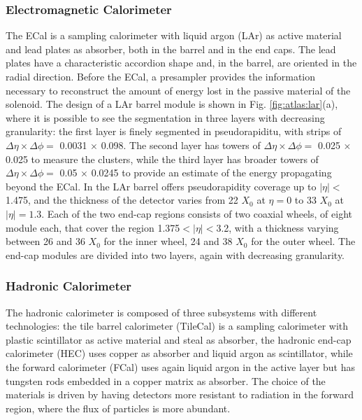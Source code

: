 \subsubsection*{Electromagnetic Calorimeter}

The ECal is a sampling calorimeter with liquid argon (LAr) as active material and lead plates as absorber, both in the barrel and in the end caps. The lead plates have a characteristic accordion shape and, in the barrel, are oriented in the radial direction. Before the ECal, a presampler provides the information necessary to reconstruct the amount of energy lost in the passive material of the solenoid. The design of a LAr barrel module is shown in Fig. \ref{fig:atlas:lar}(a), where it is possible to see the segmentation in three layers with decreasing granularity: the first layer is finely segmented in pseudorapiditu, with strips of $\Delta\eta \times \Delta\phi = $ 0.0031 $\times$ 0.098. The second layer has towers of $\Delta\eta \times \Delta\phi = $ 0.025 $\times$ 0.025 to measure the clusters, while the third layer has broader towers of $\Delta\eta \times \Delta\phi = $ 0.05 $\times$ 0.0245 to provide an estimate of the energy propagating beyond the ECal. In the LAr barrel offers pseudorapidity coverage up to $|\eta|<$1.475, and the thickness of the detector varies from 22 $X_0$ at $\eta=0$ to 33 $X_0$ at $|\eta|=1.3$. 
Each of the two end-cap regions consists of two coaxial wheels, of eight module each, that cover the region 1.375$<|\eta|<$3.2, with a thickness varying between 26 and 36 $X_0$ for the inner wheel, 24 and 38 $X_0$ for the outer wheel. The end-cap modules are divided into two layers, again with decreasing granularity.


\subsubsection*{Hadronic Calorimeter}

The hadronic calorimeter is composed of three subsystems with different technologies: the tile barrel calorimeter (TileCal) is a sampling calorimeter with plastic scintillator as active material and steal as absorber, the hadronic end-cap calorimeter (HEC) uses copper as absorber and liquid argon as scintillator, while the forward calorimeter (FCal) uses again liquid argon in the active layer but has tungsten rods embedded in a copper matrix as absorber. The choice of the materials is driven by having detectors more resistant to radiation in the forward region, where the flux of particles is more abundant. 

